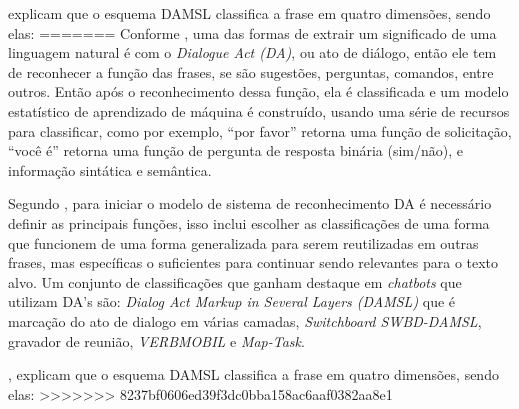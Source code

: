 \documentclass[
	12pt,				%
	oneside,
	a4paper,			%
	english,			%
	french,				%
	spanish,			%
	brazil				%
	]{abntex2}
\begin{document}
\textcite{damsl} explicam que o esquema DAMSL classifica a frase em quatro dimensões, sendo elas:
=======
Conforme \textcite{conversational-interface}, uma das formas de extrair um significado de uma linguagem natural é com o \emph{Dialogue Act (DA)}, ou ato de diálogo, então ele tem de reconhecer a função das frases, se são sugestões, perguntas, comandos, entre outros. Então após o reconhecimento dessa função, ela é classificada e um modelo estatístico de aprendizado de máquina é construído, usando uma série de recursos para classificar, como por exemplo, “por favor” retorna uma função de solicitação, “você é” retorna uma função de pergunta de resposta binária (sim/não), e informação sintática e semântica.

Segundo \textcite{da-recognition}, para iniciar o modelo de sistema de reconhecimento DA é necessário definir as principais funções, isso inclui escolher as classificações de uma forma que funcionem de uma forma generalizada para serem reutilizadas em outras frases, mas específicas o suficientes para continuar sendo relevantes para o texto alvo. Um conjunto de classificações que ganham destaque em \emph{chatbots} que utilizam DA's são: \emph{Dialog Act Markup in Several Layers (DAMSL)} que é  marcação do ato de dialogo em várias camadas, \emph{Switchboard SWBD-DAMSL}, gravador de reunião, \emph{VERBMOBIL} e \emph{Map-Task}.

\textcite{damsl}, explicam que o esquema DAMSL classifica a frase em quatro dimensões, sendo elas:
>>>>>>> 8237bf0606ed39f3dc0bba158ac6aaf0382aa8e1
\end{document}
